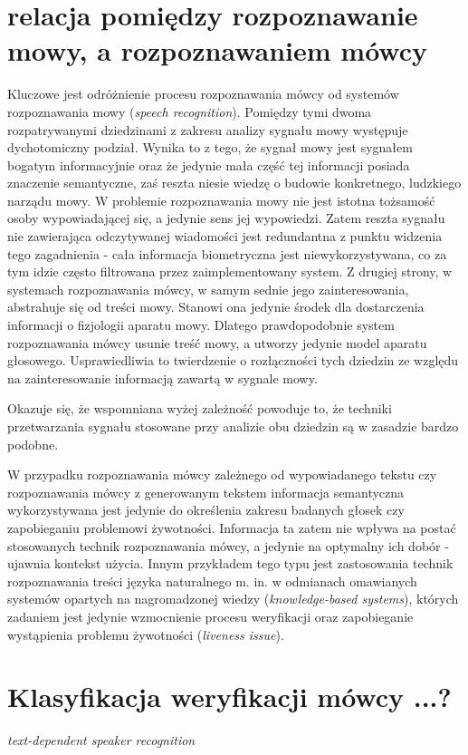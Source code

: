 \section{relacja pomiędzy rozpoznawanie mowy, a rozpoznawaniem mówcy}
Kluczowe jest odróżnienie procesu rozpoznawania mówcy od systemów rozpoznawania mowy (\textit{speech recognition}). Pomiędzy tymi dwoma rozpatrywanymi dziedzinami z zakresu analizy sygnału mowy występuje dychotomiczny podział. Wynika to z tego, że sygnał mowy jest sygnałem bogatym informacyjnie oraz że jedynie mała część tej informacji posiada znaczenie semantyczne, zaś reszta niesie wiedzę o budowie konkretnego, ludzkiego narządu mowy. W problemie rozpoznawania mowy nie jest istotna tożsamość osoby wypowiadającej się, a jedynie sens jej wypowiedzi. Zatem reszta sygnału nie zawierająca odczytywanej wiadomości jest redundantna z punktu widzenia tego zagadnienia - cała informacja biometryczna jest niewykorzystywana, co za tym idzie często filtrowana przez zaimplementowany system. Z drugiej strony, w systemach rozpoznawania mówcy, w samym sednie jego zainteresowania, abstrahuje się od treści mowy. Stanowi ona jedynie środek dla dostarczenia informacji o fizjologii aparatu mowy. Dlatego prawdopodobnie system rozpoznawania mówcy usunie treść mowy, a utworzy jedynie model aparatu głosowego. Usprawiedliwia to twierdzenie o rozłączności tych dziedzin ze względu na zainteresowanie informacją zawartą w sygnale mowy. 

Okazuje się, że wspomniana wyżej zależność powoduje to, że techniki przetwarzania sygnału stosowane przy analizie obu dziedzin są w zasadzie bardzo podobne. 

W przypadku rozpoznawania mówcy zależnego od wypowiadanego tekstu czy rozpoznawania mówcy z generowanym tekstem informacja semantyczna wykorzystywana jest jedynie do określenia zakresu badanych głosek czy zapobieganiu problemowi żywotności. Informacja ta zatem nie wpływa na postać stosowanych technik rozpoznawania mówcy, a jedynie na optymalny ich dobór - ujawnia kontekst użycia. Innym przykładem tego typu jest zastosowania technik rozpoznawania treści języka naturalnego m. in. w odmianach omawianych systemów opartych na nagromadzonej wiedzy (\textit{knowledge-based systems}), których zadaniem jest jedynie wzmocnienie procesu weryfikacji oraz zapobieganie wystąpienia problemu żywotności (\textit{liveness issue}). 

\section{Klasyfikacja weryfikacji mówcy ...?}
\textit{text-dependent speaker recognition} \cite{fosr}

